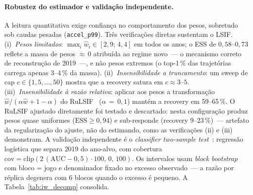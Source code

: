 \documentclass[runningheads]{llncs}
\begin{document}
\paragraph{Robustez do estimador e valida\c{c}\~ao independente.}
A leitura quantitativa exige confian\c{c}a no comportamento dos pesos, sobretudo sob caudas pesadas (\texttt{accel\_p99}). Tr\^es verifica\c{c}\~oes diretas sustentam o LSIF. (i)~\emph{Pesos limitados}: $\max_i \hat{w}_i \in [2{,}9;\,4{,}4]$ em todos os anos; o ESS de $0{,}58$--$0{,}73$ reflete a massa de pesos ${\approx}\,0$ atribu\'ida ao regime novo~--- o mecanismo correto de reconstru\c{c}\~ao de 2019~---, e n\~ao pesos extremos (o top-1\,\% das trajet\'orias carrega apenas 3--4\,\% da massa). (ii)~\emph{Insensibilidade a truncamento}: um sweep de cap $c \in \{1{,}5,\ldots,50\}$ mostra que a recovery satura em $c \approx 3$--$5$. (iii)~\emph{Insensibilidade \`a raz\~ao relativa}: aplicar aos pesos a transforma\c{c}\~ao $\hat{w}/(\alpha\hat{w}+1-\alpha)$ do RuLSIF~\cite{yamada2013} ($\alpha\,{=}\,0{,}1$) mant\'em a recovery em 59--65\,\%. O RuLSIF ajustado diretamente foi testado e descartado: nesta configura\c{c}\~ao produz pesos quase uniformes ($\mathrm{ESS} \geq 0{,}94$) e sub-responde (recovery 9--23\,\%)~--- artefato da regulariza\c{c}\~ao do ajuste, n\~ao do estimando, como as verifica\c{c}\~oes (ii) e (iii) demonstram. A valida\c{c}\~ao independente \'e o \textit{classifier two-sample test}~\cite{lopezpaz2017}: regress\~ao log\'istica que separa 2019 do ano-alvo, com cobertura $\mathrm{cov} = \mathrm{clip}(2\,(\mathrm{AUC}-0{,}5)\cdot 100,\,0,\,100)$. Os intervalos usam \emph{block bootstrap} com bloco = jogo e denominador fixado no excesso observado~--- a raz\~ao por r\'eplica degenera com 6 blocos quando o excesso \'e pequeno. A Tabela~\ref{tab:iw_decomp} consolida.
\end{document}
